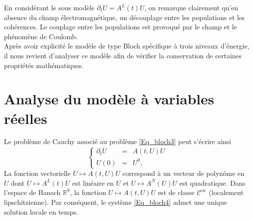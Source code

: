 \documentclass[a4paper]{article}
\newcommand{\dt}{\partial_{t}}
\begin{document}
\begin{itemize}
En considérant le sous modèle $\dt U = A^L(t) U$, on remarque clairement qu'en absence du champ électromagnétique, un découplage entre les populations et les cohérences. Le couplage entre les populations est provoqué par le champ et le phénomène de Coulomb. 
\\Après avoir explicité le modèle de type Bloch spécifique à trois niveaux d'énergie, il nous revient d'analyser ce modèle afin de vérifier la conservation de  certaines propriétés mathématiques.
\end{itemize}





\section{Analyse du modèle à variables réelles }
Le problème de Cauchy associé au problème \eqref{Eq_bloch3} peut s'écrire ainsi 
\begin{equation}
\left\{
\begin{array}{rcl}
\dt U &=& A(t,U) U\\
U(0) &=& U^0,
\end{array}
\right.
\label{Eq_bloch4}
\end{equation}
La fonction vectorielle $U\mapsto A(t,U)U$  correspond à un vecteur de polynôme en $U$ dont $U \mapsto A^L (t) U$ est linéaire en $U$ et $U \mapsto A^N(U) U$ est quadratique.
 Dans l'espace de Banach $\mathbb{R}^9$, la fonction $U\mapsto A(t,U)U$ est de classe $\mathcal{C}^{\infty}$ (localement lipschitzienne). Par conséquent, le système \eqref{Eq_bloch4} admet une unique solution locale en temps.
\end{document}
